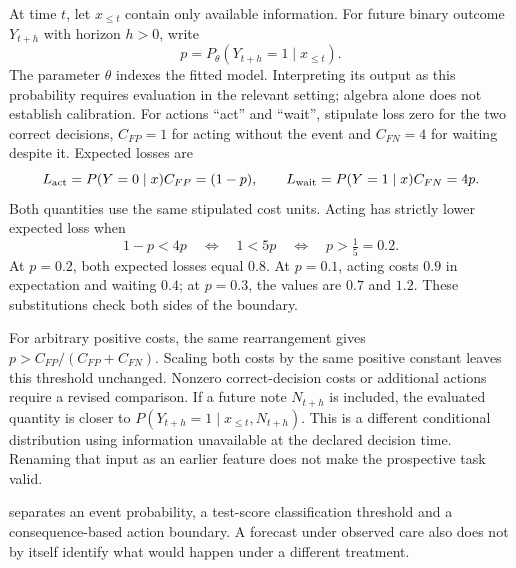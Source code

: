 At time $t$, let $x_{\leq t}$ contain only available information. For future binary outcome $Y_{t+h}$ with horizon $h>0$, write
\[
p=P_\theta(Y_{t+h}=1\mid x_{\leq t}).
\]
The parameter $\theta$ indexes the fitted model. Interpreting its output as this probability requires evaluation in the relevant setting; algebra alone does not establish calibration.
For actions ``act'' and ``wait'', stipulate loss zero for the two correct decisions, $C_{FP}=1$ for acting without the event and $C_{FN}=4$ for waiting despite it. Expected losses are
\[
L_{\rm act}=P(Y=0\mid x)C_{FP}=(1-p),\qquad
L_{\rm wait}=P(Y=1\mid x)C_{FN}=4p.
\]
Both quantities use the same stipulated cost units.
Acting has strictly lower expected loss when
\[
1-p<4p\quad\Longleftrightarrow\quad1<5p
\quad\Longleftrightarrow\quad p>\tfrac15=0.2.
\]
At $p=0.2$, both expected losses equal $0.8$. At $p=0.1$, acting costs $0.9$ in expectation and waiting $0.4$; at $p=0.3$, the values are $0.7$ and $1.2$. These substitutions check both sides of the boundary.

For arbitrary positive costs, the same rearrangement gives $p>C_{FP}/(C_{FP}+C_{FN})$. Scaling both costs by the same positive constant leaves this threshold unchanged. Nonzero correct-decision costs or additional actions require a revised comparison.
If a future note $N_{t+h}$ is included, the evaluated quantity is closer to $P(Y_{t+h}=1\mid x_{\leq t},N_{t+h})$. This is a different conditional distribution using information unavailable at the declared decision time. Renaming that input as an earlier feature does not make the prospective task valid.

 separates an event probability, a test-score classification threshold and a consequence-based action boundary. A forecast under observed care also does not by itself identify what would happen under a different treatment.
